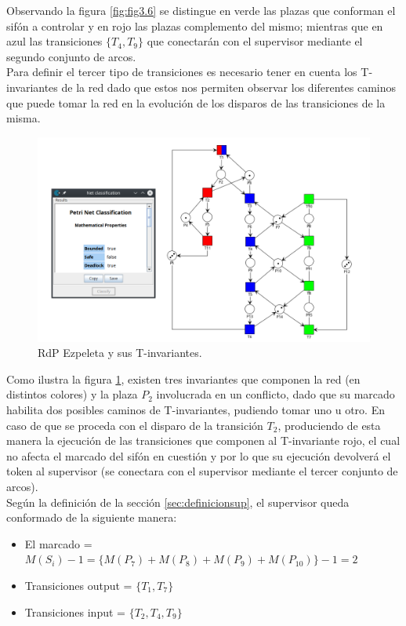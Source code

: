 Observando la figura \ref{fig:fig3.6} se distingue en verde las plazas que conforman el sifón a controlar y en rojo las plazas complemento del mismo; mientras que en azul las transiciones $\{T_4,T_9\}$ que conectarán con el supervisor mediante el segundo conjunto de arcos. \\


Para definir el tercer tipo de transiciones es necesario tener en cuenta los \break T-invariantes de la red dado que estos nos permiten observar los diferentes caminos que puede tomar la red en la evolución de los disparos de las transiciones de la misma.

 \begin{figure}[H]
	\centering
	\includegraphics[scale=0.5]{Figures/algoritmo3/desarrollo/ezpeleta3.png}
	\caption{RdP Ezpeleta y sus T-invariantes.}
	\label{fig:fig3.7}
  \end{figure}

Como ilustra la figura \ref{fig:fig3.7}, existen tres invariantes que componen la red (en distintos colores) y la plaza $P_2$ involucrada en un conflicto, dado que su marcado habilita dos posibles caminos de T-invariantes, pudiendo tomar uno u otro. 
En caso de que se proceda con el disparo de la transición $T_2$, produciendo de esta manera la ejecución de las transiciones que componen al T-invariante rojo, el cual no afecta el marcado del sifón en cuestión y por lo que su ejecución devolverá el token al supervisor (se conectara con el supervisor mediante el tercer conjunto de arcos). \\


\noindent Según la definición de la sección \ref{sec:definicionsup}, el supervisor queda conformado de la siguiente manera:
\begin{itemize}
    \item El marcado = $ M(S_i) - 1 = \{M(P_7) + M(P_8) + M(P_9) + M(P_{10}) \} -1 = 2$ 
    \item Transiciones output = $\{T_1, T_7\}$
    \item Transiciones input = $\{T_2, T_4, T_9\}$
\end{itemize}

